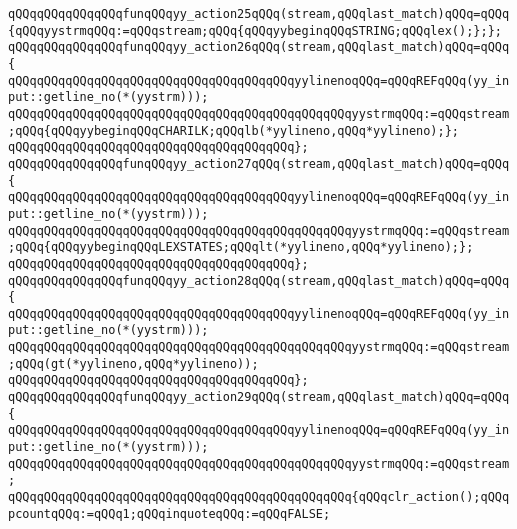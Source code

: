 \verb|qQQqqQQqqQQqqQQqfunqQQqyy_action25qQQq(stream,qQQqlast_match)qQQq=qQQq{qQQqyystrmqQQq:=qQQqstream;qQQq{qQQqyybeginqQQqSTRING;qQQqlex();};};|\newline
\verb|qQQqqQQqqQQqqQQqfunqQQqyy_action26qQQq(stream,qQQqlast_match)qQQq=qQQq{|\newline
\verb|qQQqqQQqqQQqqQQqqQQqqQQqqQQqqQQqqQQqqQQqyylinenoqQQq=qQQqREFqQQq(yy_input::getline_no(*(yystrm)));|\newline
\newline
\verb|qQQqqQQqqQQqqQQqqQQqqQQqqQQqqQQqqQQqqQQqqQQqqQQqyystrmqQQq:=qQQqstream;qQQq{qQQqyybeginqQQqCHARILK;qQQqlb(*yylineno,qQQq*yylineno);};|\newline
\verb|qQQqqQQqqQQqqQQqqQQqqQQqqQQqqQQqqQQqqQQq};|\newline
\verb|qQQqqQQqqQQqqQQqfunqQQqyy_action27qQQq(stream,qQQqlast_match)qQQq=qQQq{|\newline
\verb|qQQqqQQqqQQqqQQqqQQqqQQqqQQqqQQqqQQqqQQqyylinenoqQQq=qQQqREFqQQq(yy_input::getline_no(*(yystrm)));|\newline
\newline
\verb|qQQqqQQqqQQqqQQqqQQqqQQqqQQqqQQqqQQqqQQqqQQqqQQqyystrmqQQq:=qQQqstream;qQQq{qQQqyybeginqQQqLEXSTATES;qQQqlt(*yylineno,qQQq*yylineno);};|\newline
\verb|qQQqqQQqqQQqqQQqqQQqqQQqqQQqqQQqqQQqqQQq};|\newline
\verb|qQQqqQQqqQQqqQQqfunqQQqyy_action28qQQq(stream,qQQqlast_match)qQQq=qQQq{|\newline
\verb|qQQqqQQqqQQqqQQqqQQqqQQqqQQqqQQqqQQqqQQqyylinenoqQQq=qQQqREFqQQq(yy_input::getline_no(*(yystrm)));|\newline
\newline
\verb|qQQqqQQqqQQqqQQqqQQqqQQqqQQqqQQqqQQqqQQqqQQqqQQqyystrmqQQq:=qQQqstream;qQQq(gt(*yylineno,qQQq*yylineno));|\newline
\verb|qQQqqQQqqQQqqQQqqQQqqQQqqQQqqQQqqQQqqQQq};|\newline
\verb|qQQqqQQqqQQqqQQqfunqQQqyy_action29qQQq(stream,qQQqlast_match)qQQq=qQQq{|\newline
\verb|qQQqqQQqqQQqqQQqqQQqqQQqqQQqqQQqqQQqqQQqyylinenoqQQq=qQQqREFqQQq(yy_input::getline_no(*(yystrm)));|\newline
\newline
\verb|qQQqqQQqqQQqqQQqqQQqqQQqqQQqqQQqqQQqqQQqqQQqqQQqyystrmqQQq:=qQQqstream;|\newline
\verb|qQQqqQQqqQQqqQQqqQQqqQQqqQQqqQQqqQQqqQQqqQQqqQQq{qQQqclr_action();qQQqpcountqQQq:=qQQq1;qQQqinquoteqQQq:=qQQqFALSE;|\newline
